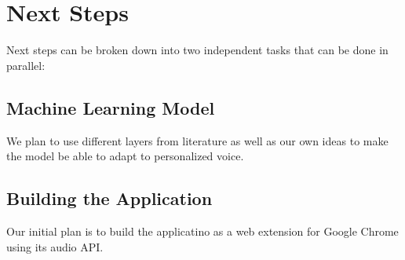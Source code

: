 \section{Next Steps}
Next steps can be broken down into two independent tasks that can be done in parallel:

\subsection{Machine Learning Model}
We plan to use different layers from literature as well as our own ideas to make the model be able to adapt to personalized voice.


\subsection{Building the Application}
Our initial plan is to build the applicatino as a web extension for Google Chrome using its audio API.

